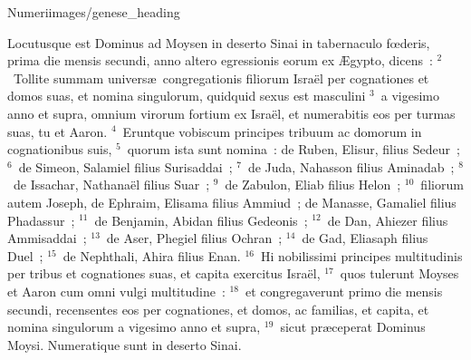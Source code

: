 {Numeri}{images/genese_heading}


\lettrine[lines=6,image=true,loversize=0.05,lraise=-0.03]{L}{}ocutusque est Dominus ad Moysen in deserto Sinai in tabernaculo fœderis, prima die mensis secundi, anno altero egressionis eorum ex \AE gypto, dicens~:
${}^{2}$~Tollite summam univers\ae\ congregationis filiorum Isra\"el per cognationes et domos suas, et nomina singulorum, quidquid sexus est masculini
${}^{3}$~a vigesimo anno et supra, omnium virorum fortium ex Isra\"el, et numerabitis eos per turmas suas, tu et Aaron.
${}^{4}$~Eruntque vobiscum principes tribuum ac domorum in cognationibus suis,
${}^{5}$~quorum ista sunt nomina~: de Ruben, Elisur, filius Sedeur~;
${}^{6}$~de Simeon, Salamiel filius Surisaddai~;
${}^{7}$~de Juda, Nahasson filius Aminadab~;
${}^{8}$~de Issachar, Nathana\"el filius Suar~;
${}^{9}$~de Zabulon, Eliab filius Helon~;
${}^{10}$~filiorum autem Joseph, de Ephraim, Elisama filius Ammiud~; de Manasse, Gamaliel filius Phadassur~;
${}^{11}$~de Benjamin, Abidan filius Gedeonis~;
${}^{12}$~de Dan, Ahiezer filius Ammisaddai~;
${}^{13}$~de Aser, Phegiel filius Ochran~;
${}^{14}$~de Gad, Eliasaph filius Duel~;
${}^{15}$~de Nephthali, Ahira filius Enan.
${}^{16}$~Hi nobilissimi principes multitudinis per tribus et cognationes suas, et capita exercitus Isra\"el,
${}^{17}$~quos tulerunt Moyses et Aaron cum omni vulgi multitudine~:
${}^{18}$~et congregaverunt primo die mensis secundi, recensentes eos per cognationes, et domos, ac familias, et capita, et nomina singulorum a vigesimo anno et supra,
${}^{19}$~sicut pr\ae ceperat Dominus Moysi. Numeratique sunt in deserto Sinai.


